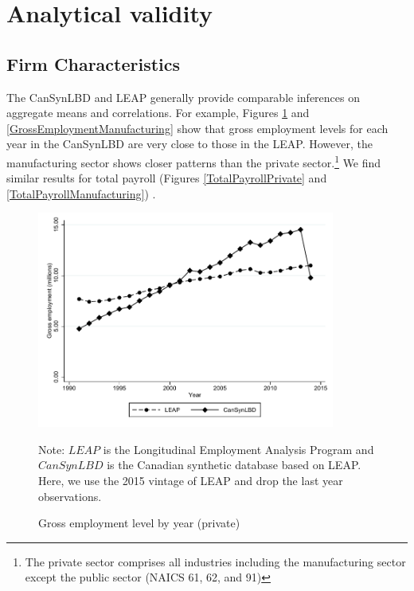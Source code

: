 \documentclass{article}
\begin{document}

\section{Analytical validity}

\newcommand{\TableNote}{$LEAP$ is the Longitudinal Employment Analysis Program and $CanSynLBD$ is the Canadian synthetic database based on LEAP. Here, we use the 2015 vintage of LEAP and drop the last year observations.}

\subsection{Firm Characteristics}

The CanSynLBD and LEAP generally provide comparable inferences on aggregate means and correlations. For example, Figures \ref{GrossEmploymentPrivate} and \ref{GrossEmploymentManufacturing} show that gross employment levels for each year in the CanSynLBD are very close to those in the LEAP. However, the manufacturing sector shows closer patterns than the private sector.\footnote{The private sector comprises all industries including the manufacturing sector except the public sector  (NAICS 61, 62, and 91)} We find similar results for total payroll (Figures \ref{TotalPayrollPrivate} and  \ref{TotalPayrollManufacturing}) .

 
\begin{figure} [H]
\centering
\caption{Gross employment level by year (private)} \label{GrossEmploymentPrivate}
\includegraphics[height=2.8in, width=.7\linewidth]{graphs/Gross_employment_level_by_year_private_bw.pdf} 
\begin{minipage}{0.85\textwidth}
{\footnotesize Note: \TableNote \par}
\end{minipage}
\end{figure}
\end{document}
